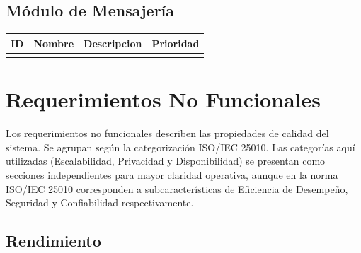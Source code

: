 \subsection{Módulo de Mensajería}

\begin{longtable}{L{1.6cm} L{3.2cm} L{8cm} L{1.5cm}}
  \toprule
  \textbf{\color{fmAccent}ID} &
  \textbf{\color{fmAccent}Nombre} &
  \textbf{\color{fmAccent}Descripcion} &
  \textbf{\color{fmAccent}Prioridad} \\
  \midrule
  \endhead

  \bottomrule
\end{longtable}

\section{Requerimientos No Funcionales}

Los requerimientos no funcionales describen las propiedades de calidad del sistema. Se agrupan según la categorización ISO/IEC 25010. Las categorías aquí utilizadas (Escalabilidad, Privacidad y Disponibilidad) se presentan como secciones independientes para mayor claridad operativa, aunque en la norma ISO/IEC 25010 corresponden a subcaracterísticas de Eficiencia de Desempeño, Seguridad y Confiabilidad respectivamente.

\subsection{Rendimiento}


